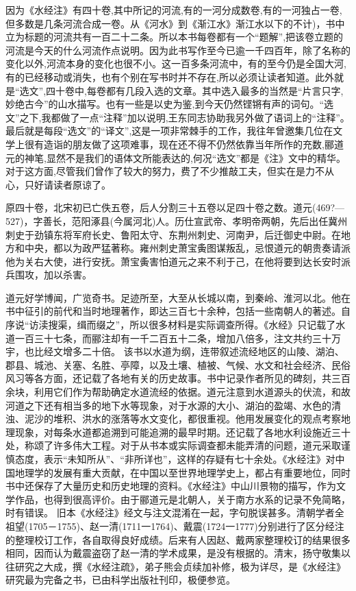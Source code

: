 \documentclass[12pt,UTF8]{ctexbook}
\begin{document}
因为《水经注》有四十卷,其中所记的河流,有的一河分成数卷,有的一河独占一卷,但多数是几条河流合成一卷。从《河水》到《渐江水》渐江水以下的不计)，书中立为标题的河流共有一百二十二条。所以本书每卷都有一个“题解”,把该卷立题的河流是今天的什么河流作点说明。因为此书写作至今已逾一千四百年，除了名称的变化以外,河流本身的变化也很不小。这一百多条河流中，有的至今仍是全国大河,有的已经移动或消失，也有个别在写书时并不存在,所以必须让读者知道。此外就是“选文”,四十卷中,每卷都有几段入选的文章。其中选入最多的当然是“片言只字,妙绝古今”的山水描写。也有一些是以史为鉴,到今天仍然铿锵有声的词句。“选文”之下,我都做了一点“注释”加以说明,王东同志协助我另外做了语词上的“注释”。最后就是每段“选文”的“译文”,这是一项非常棘手的工作，我往年曾邀集几位在文学上很有造诣的朋友做了这项难事，现在还不得不仍然依靠当年所作的充数,郦道元的神笔,显然不是我们的语体文所能表达的,何况“选文”都是《注》文中的精华。对于这方面,尽管我们曾作了较大的努力，费了不少推敲工夫，但实在是力不从心，只好请读者原谅了。


原四十卷，北宋初已亡佚五卷，后人分割三十五卷以足四十卷之数。道元(469?—527)，字善长，范阳涿县(今属河北)人。历仕宣武帝、孝明帝两朝，先后出任冀州刺史于劲镇东将军府长史、鲁阳太守、东荆州刺史、河南尹，后迁御史中尉。在地方和中央，都以为政严猛著称。雍州刺史萧宝夤图谋叛乱，忌恨道元的朝贵奏请派他为关右大使，进行安抚。萧宝夤害怕道元之来不利于己，在他将要到达长安时派兵围攻，加以杀害。

道元好学博闻，广览奇书。足迹所至，大至从长城以南，到秦岭、淮河以北。他在书中征引的前代和当时地理著作，即达三百七十余种，包括一些南朝人的著述。自序说“访渎搜渠，缉而缀之”，所以很多材料是实际调查所得。《水经》只记载了水道一百三十七条，而郦注却有一千二百五十二条，增加八倍多，注文共约三十万宇，也比经文增多二十倍。
该书以水道为纲，连带叙述流经地区的山陵、湖泊、郡县、城池、关塞、名胜、亭障，以及土壤、植被、气候、水文和社会经济、民俗风习等各方面，还记载了各地有关的历史故事。书中记录作者所见的碑刻，共三百余块，利用它们作为帮助确定水道流经的依据。道元注意到水道源头的伏流，和故河道之下还有相当多的地下水等现象，对于水源的大小、湖泊的盈竭、水色的清浊、泥沙的堆积、洪水的涨落等水文变化，都很重视。他用发展变化的观点考察地理现象，对每条水道都追溯到可能追溯的最早时期。还记载了各地水利设施近三十处，称颂了许多伟大工程。对于从书本或实际调查都未能弄清的问题，道元采取谨慎态度，表示“未知所从”、“非所详也”，这样的存疑有七十余处。《水经注》对中国地理学的发展有重大贡献，在中国以至世界地理学史上，都占有重要地位，同时书中还保存了大量历史和历史地理的资料。《水经注》中山川景物的描写，作为文学作品，也得到很高评价。由于郦道元是北朝人，关于南方水系的记录不免简略，时有错误。
旧本《水经注》经文与注文混淆在一起，字句脱误甚多。清朝学者全祖望(1705－1755)、赵一清(1711一1764)、戴震(1724一1777)分别进行了区分经注的整理校订工作，各自取得良好成绩。后来有人因赵、戴两家整理校订的结果很多相同，因而认为戴震盗窃了赵一清的学术成果，是没有根据的。清末，扬守敬集以往研究之大成，撰《水经注疏》，弟子熊会贞续加补修，极为详尽，是《水经注》研究最为完备之书，已由科学出版社刊印，极便参览。
\end{document}
